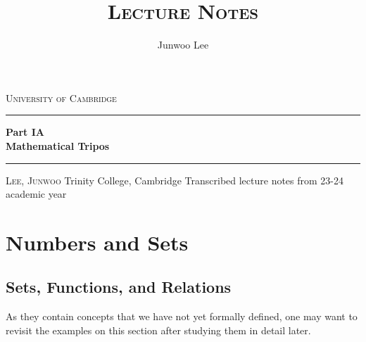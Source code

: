 \documentclass[10pt, a4paper, twoside]{report}
\title{\LARGE{\textsc{Lecture Notes}}}
\author{Junwoo Lee}
\date{}
\begin{document}
\begin{titlepage}
  \begingroup %
  \def\drop{0.1\textheight}
  \vspace*{\drop}
  \begin{center}
  {\LARGE\textsc{University of Cambridge}}\\[\drop]
  \rule{\textwidth}{1pt}\par
  \vspace{0.5\baselineskip}
  {\huge\bfseries Part IA\\
   \large Mathematical Tripos}\\[0.5\baselineskip]
  \rule{\textwidth}{1pt}\par
  \vfill
  {\Large\textsc{Lee, Junwoo}}
  \vfill
  Trinity College, Cambridge
  \vfill
  {\large Transcribed lecture notes from 23-24 academic year}
  \end{center}
  \endgroup
\end{titlepage}
\tableofcontents

\chapter{Numbers and Sets}
\section{Sets, Functions, and Relations}
As they contain concepts that we have not yet formally defined, one may want to revisit the examples on this section after studying them in detail later.
\end{document}
